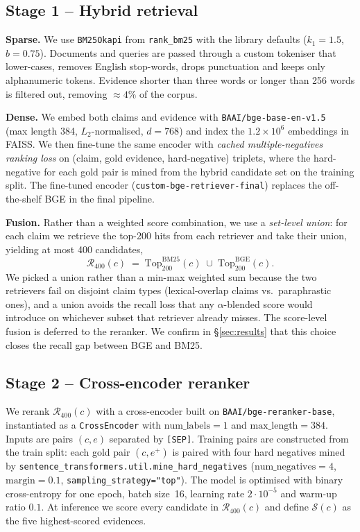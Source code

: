 \documentclass[11pt]{article}
\begin{document}
\subsection{Stage 1 -- Hybrid retrieval}
\label{sec:retrieval}
\textbf{Sparse.} We use \texttt{BM25Okapi} from \texttt{rank\_bm25}
with the library defaults ($k_1\!=\!1.5$, $b\!=\!0.75$). Documents
and queries are passed through a custom tokeniser that lower-cases,
removes English stop-words, drops punctuation and keeps only
alphanumeric tokens. Evidence shorter than three words or longer than
256 words is filtered out, removing $\approx 4\%$ of the corpus.

\textbf{Dense.} We embed both claims and evidence with
\texttt{BAAI/bge-base-en-v1.5}~\citep{xiao2024bge}
(max length 384, $L_2$-normalised, $d\!=\!768$) and index the
$1.2\!\times\!10^6$ embeddings in FAISS. We then fine-tune the same
encoder with \emph{cached multiple-negatives ranking loss}
on (claim, gold evidence, hard-negative) triplets, where the
hard-negative for each gold pair is mined from the hybrid candidate
set on the training split. The fine-tuned encoder
(\texttt{custom-bge-retriever-final}) replaces the off-the-shelf BGE
in the final pipeline.

\textbf{Fusion.} Rather than a weighted score combination, we use a
\emph{set-level union}: for each claim we retrieve the top-200 hits
from each retriever and take their union, yielding at most 400
candidates,
\begin{equation}
\mathcal{R}_{400}(c) \;=\; \mathrm{Top}_{200}^{\mathrm{BM25}}(c)\;\cup\;
                      \mathrm{Top}_{200}^{\mathrm{BGE}}(c).
\label{eq:hybrid}
\end{equation}
We picked a union rather than a min-max weighted sum because the two
retrievers fail on disjoint claim types (lexical-overlap claims vs.\
paraphrastic ones), and a union avoids the recall loss that any
$\alpha$-blended score would introduce on whichever subset that
retriever already misses. The score-level fusion is deferred to the
reranker. We confirm in \S\ref{sec:results} that this choice closes
the recall gap between BGE and BM25.

\subsection{Stage 2 -- Cross-encoder reranker}
\label{sec:reranker}
We rerank $\mathcal{R}_{400}(c)$ with a cross-encoder built on
\texttt{BAAI/bge-reranker-base}, instantiated as a
\texttt{CrossEncoder} with $\text{num\_labels}\!=\!1$ and
$\text{max\_length}\!=\!384$. Inputs are pairs $(c,e)$ separated by
\verb|[SEP]|. Training pairs are constructed from the train split:
each gold pair $(c,e^{+})$ is paired with four hard negatives mined
by \texttt{sentence\_transformers.util.mine\_hard\_negatives}
($\text{num\_negatives}\!=\!4$, $\text{margin}\!=\!0.1$,
\verb|sampling_strategy="top"|). The model is optimised with binary
cross-entropy for one epoch, batch size~16, learning rate $2{\cdot}10^{-5}$
and warm-up ratio $0.1$. At inference we score every candidate in
$\mathcal{R}_{400}(c)$ and define $\mathcal{S}(c)$ as the five
highest-scored evidences.
\end{document}

